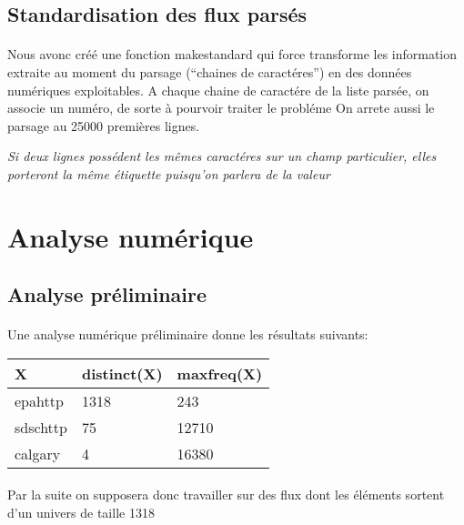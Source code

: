 \documentclass[a4paper,11pt]{article}%
\newcommand{\dbend}{{\manual\char127}}
\newenvironment{attention}%
{\description\item[\dbend]\sl}%
{\enddescription}
\begin{document}
\subsection{Standardisation des flux parsés}

\paragraph{}Nous avonc créé une fonction makestandard qui force transforme les information extraite au moment du parsage (``chaines de caractéres'') en des données numériques exploitables.\newline
A chaque chaine de caractére de la liste parsée, on associe un numéro, de sorte à pourvoir traiter le probléme On arrete aussi le parsage au 25000 premières lignes.

\begin{attention}
 Si deux lignes possédent les mêmes caractéres sur un champ particulier, elles porteront la même étiquette puisqu'on parlera de la valeur
\end{attention}

\section{Analyse numérique}

\subsection{Analyse préliminaire}

\paragraph{}Une analyse numérique préliminaire donne les résultats suivants:

\begin{tabularx}{\textwidth}{|l|l|X|}
      \hline X & distinct(X) & maxfreq(X) \\ \hline
      epahttp & 1318 & 243  \\ \hline
      sdschttp & 75 & 12710 \\ \hline
      calgary & 4 & 16380  \\ \hline
\end{tabularx}

\paragraph{}Par la suite on supposera donc travailler sur des flux dont les éléments sortent d'un univers de taille 1318
\end{document}
